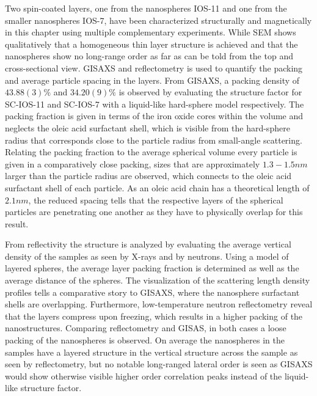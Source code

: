 \documentclass[\main/dresen_thesis.tex]{subfiles}
\begin{document}
  \label{sec:looselyPackedNS:layers:summary}
  Two spin-coated layers, one from the nanospheres IOS-11 and one from the smaller nanospheres IOS-7, have been characterized structurally and magnetically in this chapter using multiple complementary experiments.
  While SEM shows qualitatively that a homogeneous thin layer structure is achieved and that the nanospheres show no long-range order as far as can be told from the top and cross-sectional view.
  GISAXS and reflectometry is used to quantify the packing and average particle spacing in the layers.
  From GISAXS, a packing density of $43.88(3) \%$ and $34.20(9) \%$ is observed by evaluating the structure factor for SC-IOS-11 and SC-IOS-7 with a liquid-like hard-sphere model respectively.
  The packing fraction is given in terms of the iron oxide cores within the volume and neglects the oleic acid surfactant shell, which is visible from the hard-sphere radius that corresponds close to the particle radius from small-angle scattering.
  Relating the packing fraction to the average spherical volume every particle is given in a comparatively close packing, sizes that are approximately $1.3 - 1.5 \unit{nm}$ larger than the particle radius are observed, which connects to the oleic acid surfactant shell of each particle.
  As an oleic acid chain has a theoretical length of $2.1 \unit{nm}$, the reduced spacing tells that the respective layers of the spherical particles are penetrating one another as they have to physically overlap for this result.

  From reflectivity the structure is analyzed by evaluating the average vertical density of the samples as seen by X-rays and by neutrons.
  Using a model of layered spheres, the average layer packing fraction is determined as well as the average distance of the spheres.
  The visualization of the scattering length density profiles tells a comparative story to GISAXS, where the nanosphere surfactant shells are overlapping.
  Furthermore, low-temperature neutron reflectometry reveal that the layers compress upon freezing, which results in a higher packing of the nanostructures.
  Comparing reflectometry and GISAS, in both cases a loose packing of the nanospheres is observed.
  On average the nanospheres in the samples have a layered structure in the vertical structure across the sample as seen by reflectometry, but no notable long-ranged lateral order is seen as GISAXS would show otherwise visible higher order correlation peaks instead of the liquid-like structure factor.
\end{document}
